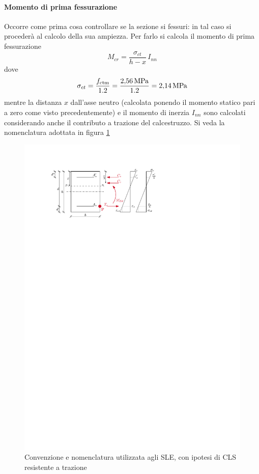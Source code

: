 \paragraph{Momento di  prima fessurazione}
Occorre come prima cosa controllare se la sezione si fessuri: in tal caso si procederà al calcolo della sua ampiezza.
Per farlo si calcola il momento di prima fessurazione 
\begin{equation}
    M_{cr} = \frac{ \sigma_{ct} }{ { h - x } } \, I_{nn} 
\end{equation}
dove 
\[
    \sigma_{ct} = \frac{ f_\textup{ctm} }{ 1.2 }  = \frac{ \SI{2.56}{\mega\pascal} }{ 1.2 } = \SI{2.14}{\mega\pascal}    
\]
mentre la distanza $x$ dall'asse neutro (calcolata ponendo il momento statico pari a zero come visto precedentemente) e il momento di inerzia $I_{nn}$ sono calcolati considerando anche il contributo a trazione del calcestruzzo. 
Si veda la nomenclatura adottata in figura \ref{fig:sle_convenzioneTraz}
\begin{figure}[htb]
    \centering
    \includegraphics[height=0.25\textheight]{IMG/IPE_sle_cls_Traz.pdf}
    \caption{Convenzione e nomenclatura utilizzata agli SLE, con ipotesi di CLS resistente a trazione}
    \label{fig:sle_convenzioneTraz}
  \end{figure}

